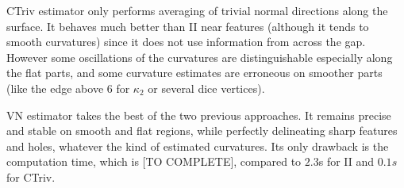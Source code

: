 \documentclass[runningheads]{llncs}
\begin{document}
    CTriv estimator only performs averaging of trivial normal
    directions along the surface. It behaves much better than II near
    features (although it tends to smooth curvatures) since it does
    not use information from across the gap. However some oscillations
    of the curvatures are distinguishable especially along the flat
    parts, and some curvature estimates are erroneous on smoother
    parts (like the edge above 6 for $\kappa_2$ or several dice
    vertices).

    VN estimator takes the best of the two previous approaches. It
    remains precise and stable on smooth and flat regions, while
    perfectly delineating sharp features and holes, whatever the kind
    of estimated curvatures. Its only drawback is the computation
    time, which is [TO COMPLETE], compared to $2.3$s for II and $0.1s$
    for CTriv.


    \newcommand{\MyZoom}[1]{%
      \begin{tikzpicture}[spy using outlines={circle,magnification=1.8,size=2cm,connect spies}]
        \node[inner sep=0pt] {\pgfimage[width=0.3\textwidth]{#1}};
        \spy[overlay,blue] on (0.4,0.2) in node at (-0.8,0.8);
      \end{tikzpicture}}
\end{document}
